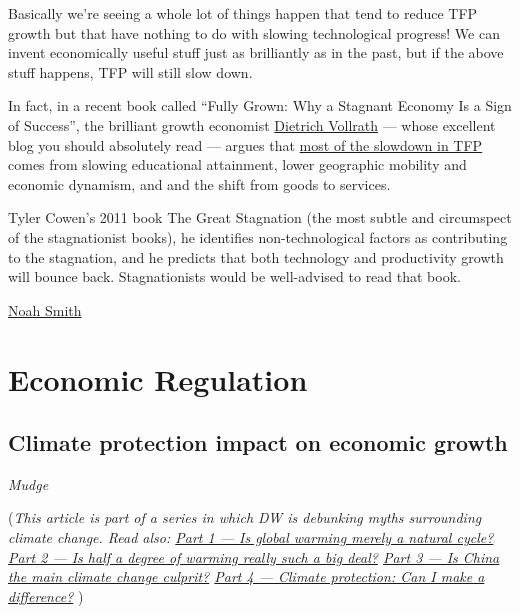 \documentclass[
]{book}
\begin{document}
Basically we're seeing a whole lot of things happen that tend to reduce TFP growth but that have nothing to do with slowing technological progress! We can invent economically useful stuff just as brilliantly as in the past, but if the above stuff happens, TFP will still slow down.

In fact, in a recent book called ``Fully Grown: Why a Stagnant Economy Is a Sign of Success'', the brilliant growth economist \href{https://growthecon.com/blog/}{Dietrich Vollrath} --- whose excellent blog you should absolutely read --- argues that \href{https://medium.com/@mattclancy/fully-grown-a-review-a55719c6049c}{most of the slowdown in TFP} comes from slowing educational attainment, lower geographic mobility and economic dynamism, and and the shift from goods to services.

Tyler Cowen's 2011 book The Great Stagnation (the most subtle and circumspect of the stagnationist books), he identifies non-technological factors as contributing to the stagnation, and he predicts that both technology and productivity growth will bounce back. Stagnationists would be well-advised to read that book.

\href{https://noahpinion.substack.com/p/answering-the-techno-pessimists-complete}{Noah Smith}

\hypertarget{economic-regulation}{%
\chapter{Economic Regulation}\label{economic-regulation}}

\hypertarget{climate-protection-impact-on-economic-growth}{%
\section{Climate protection impact on economic growth}\label{climate-protection-impact-on-economic-growth}}

\emph{Mudge}

(\emph{This article is part of a series in which DW is debunking myths surrounding climate change.
Read also:
\href{https://www.dw.com/en/fact-check-is-global-warming-merely-a-natural-cycle/a-57831350}{Part 1 --- Is global warming merely a natural cycle?}
\href{https://www.dw.com/en/fact-check-is-half-a-degree-of-warming-really-such-a-big-deal-for-the-planet/a-57859167}{Part 2 --- Is half a degree of warming really such a big deal?}
\href{https://www.dw.com/en/fact-check-is-china-the-main-climate-change-culprit/a-57777113}{Part 3 --- Is China the main climate change culprit?}
\href{https://www.dw.com/en/fact-check-what-can-i-do-for-climate-protection/a-57980888}{Part 4 --- Climate protection: Can I make a difference?} })
\end{document}

